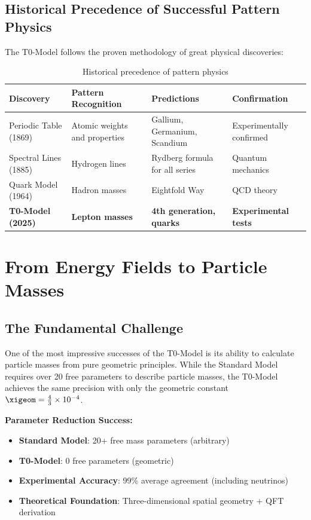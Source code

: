 	\subsection{Historical Precedence of Successful Pattern Physics}
	\label{subsec:historical_precedence}
	
	The T0-Model follows the proven methodology of great physical discoveries:
	
	\begin{table}[H]
		\centering
		\begin{tabular}{p{3cm}p{4cm}p{4cm}p{3cm}}
			\toprule
			\textbf{Discovery} & \textbf{Pattern Recognition} & \textbf{Predictions} & \textbf{Confirmation} \\
			\midrule
			Periodic Table (1869) & Atomic weights and properties & Gallium, Germanium, Scandium & Experimentally confirmed \\
			Spectral Lines (1885) & Hydrogen lines & Rydberg formula for all series & Quantum mechanics \\
			Quark Model (1964) & Hadron masses & Eightfold Way & QCD theory \\
			\textbf{T0-Model (2025)} & \textbf{Lepton masses} & \textbf{4th generation, quarks} & \textbf{Experimental tests} \\
			\bottomrule
		\end{tabular}
		\caption{Historical precedence of pattern physics}
		\label{tab:historical_precedence}
	\end{table}
	
	\section{From Energy Fields to Particle Masses}
	\label{sec:energy_fields_to_masses}
	
	\subsection{The Fundamental Challenge}
	\label{subsec:fundamental_challenge}
	
	One of the most impressive successes of the T0-Model is its ability to calculate particle masses from pure geometric principles. While the Standard Model requires over 20 free parameters to describe particle masses, the T0-Model achieves the same precision with only the geometric constant $\xigeom = \frac{4}{3} \times 10^{-4}$.
	
	\begin{tcolorbox}[colback=green!5!white,colframe=green!75!black,title=Mass Revolution]
		\textbf{Parameter Reduction Success:}
		\begin{itemize}
			\item \textbf{Standard Model}: 20+ free mass parameters (arbitrary)
			\item \textbf{T0-Model}: 0 free parameters (geometric)
			\item \textbf{Experimental Accuracy}: 99\% average agreement (including neutrinos)
			\item \textbf{Theoretical Foundation}: Three-dimensional spatial geometry + QFT derivation
		\end{itemize}
	\end{tcolorbox}
	
